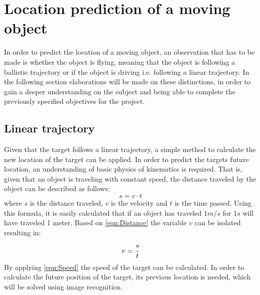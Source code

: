 \section{Location prediction of a moving object}
In order to predict the location of a moving object, an observation that has to be made is whether the object is flying, meaning that the object is following a ballistic trajectory or if the object is driving i.e{.} following a linear trajectory. 
In the following section elaborations will be made on these distinctions, in order to gain a deeper understanding on the subject and being able to complete the previously specified objectives for the project. 
\subsection{Linear trajectory}
Given that the target follows a linear trajectory, a simple method to calculate the new location of the target can be applied.  
In order to predict the targets future location, an understanding of basic physics of kinematics is required. 
That is, given that an object is traveling with constant speed, the distance traveled by the object can be described as follows:
\begin{equation}\label{eqn:Distance}
s = v \cdot t
\end{equation}
where $ s $ is the distance traveled, $ v $ is the velocity and $ t $ is the time passed.
Using this formula, it is easily calculated that if an object has traveled $ 1 m/s $ for $ 1 s $ will have traveled 1 meter. 
Based on \autoref{eqn:Distance} the variable $ v $ can be isolated resulting in:
\begin{equation}\label{eqn:Speed}
v = \cfrac{s}{t}
\end{equation}
By applying \autoref{eqn:Speed} the speed of the target can be calculated. 
In order to calculate the future position of the target, its previous location is needed, which will be solved using image recognition.

%
